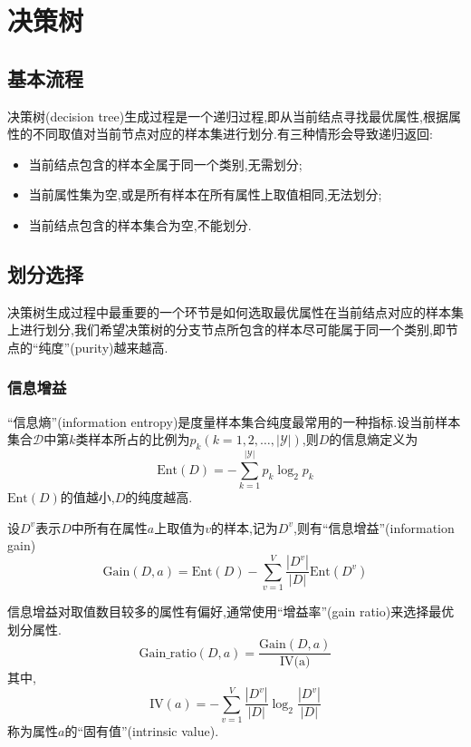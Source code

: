 \chapter{决策树}

\section{基本流程}

决策树(decision tree)生成过程是一个递归过程,即从当前结点寻找最优属性,根据属性的不同取值对当前节点对应的样本集进行划分.有三种情形会导致递归返回:

\begin{itemize}
\item 当前结点包含的样本全属于同一个类别,无需划分;
\item 当前属性集为空,或是所有样本在所有属性上取值相同,无法划分;
\item 当前结点包含的样本集合为空,不能划分.
\end{itemize}

\section{划分选择}

决策树生成过程中最重要的一个环节是如何选取最优属性在当前结点对应的样本集上进行划分,我们希望决策树的分支节点所包含的样本尽可能属于同一个类别,即节点的``纯度''(purity)越来越高.

\subsection{信息增益}

``信息熵''(information entropy)是度量样本集合纯度最常用的一种指标.设当前样本集合$\mathcal D$中第$k$类样本所占的比例为$p_k(k=1,2,\dots,|\mathcal Y|)$,则$D$的信息熵定义为
\begin{equation}
\text{Ent}(D)=-\sum_{k=1}^{|\mathcal Y|}p_k\log_2p_k
\end{equation}
$\text{Ent}(D)$的值越小,$D$的纯度越高.

设$D^v$表示$D$中所有在属性$a$上取值为$v$的样本,记为$D^v$,则有``信息增益''(information gain)
\begin{equation}
\text{Gain}(D,a)=\text{Ent}(D)-\sum_{v=1}^V\frac{|D^v|}{|D|}\text{Ent}(D^v)
\end{equation}

信息增益对取值数目较多的属性有偏好,通常使用``增益率''(gain ratio)来选择最优划分属性.
\begin{equation}
\text{Gain\_ratio}(D,a)=\frac{\text{Gain}(D,a)}{\text{IV(a)}}
\end{equation}
其中,
\begin{equation}
\text{IV}(a)=-\sum_{v=1}^V\frac{|D^v|}{|D|}\log_2\frac{|D^v|}{|D|}
\end{equation}
称为属性$a$的``固有值''(intrinsic value).

